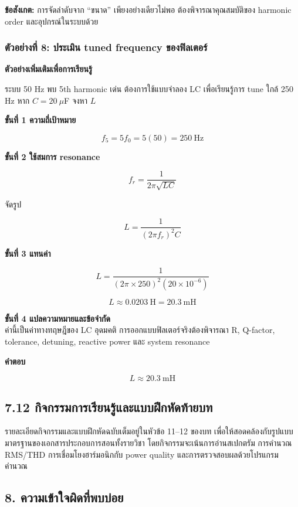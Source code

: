 \textbf{ข้อสังเกต:} การจัดลำดับจาก “ขนาด” เพียงอย่างเดียวไม่พอ ต้องพิจารณาคุณสมบัติของ harmonic order และอุปกรณ์ในระบบด้วย

\subsubsection{ตัวอย่างที่ 8: ประเมิน tuned frequency ของฟิลเตอร์}

\textbf{ตัวอย่างเพิ่มเติมเพื่อการเรียนรู้}

ระบบ 50 Hz พบ 5th harmonic เด่น ต้องการใช้แบบจำลอง LC เพื่อเรียนรู้การ tune ใกล้ 250 Hz หาก $C=20\ \mu$F จงหา $L$

\textbf{ขั้นที่ 1 ความถี่เป้าหมาย}

\[
f_5=5f_0=5(50)=250\ \text{Hz}
\]

\textbf{ขั้นที่ 2 ใช้สมการ resonance}

\[
f_r=\frac{1}{2\pi\sqrt{LC}}
\]

จัดรูป

\[
L=\frac{1}{(2\pi f_r)^2C}
\]

\textbf{ขั้นที่ 3 แทนค่า}

\[
L=\frac{1}{(2\pi\times250)^2(20\times10^{-6})}
\]

\[
L\approx0.0203\ \text{H}=20.3\ \text{mH}
\]

\textbf{ขั้นที่ 4 แปลความหมายและข้อจำกัด} \\
ค่านี้เป็นค่าทางทฤษฎีของ LC อุดมคติ การออกแบบฟิลเตอร์จริงต้องพิจารณา R, Q-factor, tolerance, detuning, reactive power และ system resonance

\textbf{คำตอบ}

\[
\boxed{L\approx20.3\ \text{mH}}
\]



\subsection{7.12 กิจกรรมการเรียนรู้และแบบฝึกหัดท้ายบท}

รายละเอียดกิจกรรมและแบบฝึกหัดฉบับเต็มอยู่ในหัวข้อ 11–12 ของบท เพื่อให้สอดคล้องกับรูปแบบมาตรฐานของเอกสารประกอบการสอนทั้งรายวิชา โดยกิจกรรมจะเน้นการอ่านสเปกตรัม การคำนวณ RMS/THD การเชื่อมโยงฮาร์มอนิกกับ power quality และการตรวจสอบผลด้วยโปรแกรมคำนวณ



\subsection{8. ความเข้าใจผิดที่พบบ่อย}

